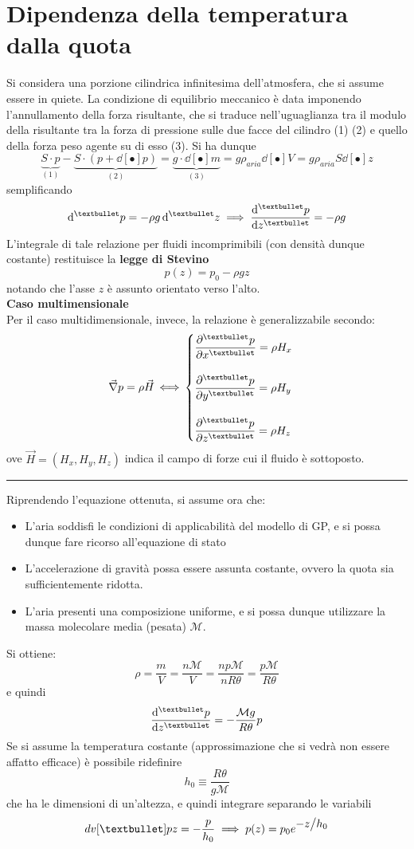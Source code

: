 \documentclass[10pt, oneside]{book}
\newcommand{\molms}{\mathcal{M}}
\newcommand{\infobox}[2]{\vspace{0.5cm}~\\ \textbf{#1} \hrulefill \vspace{0.2cm}\\#2 {}\,\\\hrule \vspace{0.5cm}}
\newcommand{\ds}{\displaystyle}
\begin{document}
\section{Dipendenza della temperatura dalla quota}
Si considera una porzione cilindrica infinitesima dell'atmosfera, che si assume essere in quiete. La condizione di equilibrio meccanico è data imponendo l'annullamento della forza risultante, che si traduce nell'uguaglianza tra il modulo della risultante tra la forza di pressione sulle due facce del cilindro (1) (2) e quello della forza peso agente su di esso (3). Si ha dunque
\[\underbrace{S \cdot p}_{(1)} - \underbrace{S \cdot (p + \dd[•]{p})}_{(2)} = \underbrace{g \cdot \dd[•]{m}}_{(3)} = g \rho_{aria} \dd[•]{V} = g \rho_{aria} S \dd[•]{z}\]
semplificando
\[\dd[•]{p} = - \rho g \dd[•]{z} \implies \dv[•]{p}{z} = - \rho g\]
L'integrale di tale relazione per fluidi incomprimibili (con densità dunque costante) restituisce la \textbf{legge di Stevino}
\[p(z) = p_0 - \rho g z\]
notando che l'asse $z$ è assunto orientato verso l'alto.
\infobox{Caso multimensionale}{
Per il caso multidimensionale, invece, la relazione è generalizzabile secondo:
\[\vec{\nabla} p = \rho \vec{H} \, \Longleftrightarrow \, \begin{cases} \displaystyle \pdv[•]{p}{x} = \rho H_x \\ \\ \displaystyle \pdv[•]{p}{y} = \rho H_y \\ \\ \ds \pdv[•]{p}{z} = \rho H_z
\end{cases}
\]
ove $\ds \vec{H} = (H_x, H_y, H_z)$ indica il campo di forze cui il fluido è sottoposto.
}

Riprendendo l'equazione ottenuta, si assume ora che:
\begin{itemize}
\item L'aria soddisfi le condizioni di applicabilità del modello di GP, e si possa dunque fare ricorso all'equazione di stato
\item L'accelerazione di gravità possa essere assunta costante, ovvero la quota sia sufficientemente ridotta.
\item L'aria presenti una composizione uniforme, e si possa dunque utilizzare la massa molecolare media (pesata) $\molms$.
\end{itemize}
Si ottiene:
\[\rho = \frac{m}{V} = \frac{n \molms}{V} = \frac{np \molms}{n R \theta} = \frac{p \molms}{R \theta}\]
e quindi
\[\dv[•]{p}{z} = - \frac{\molms g}{R \theta} p\]
Se si assume la temperatura costante (approssimazione che si vedrà non essere affatto efficace) è possibile ridefinire
\[h_0 \equiv \frac{R \theta}{g \molms}\]
che ha le dimensioni di un'altezza, e quindi integrare separando le variabili
\[\\dv[•]{p}{z} = - \frac{p}{h_0} \implies p(z) = p_0 e^{\ds - z\big/ h_0}\]
\end{document}
